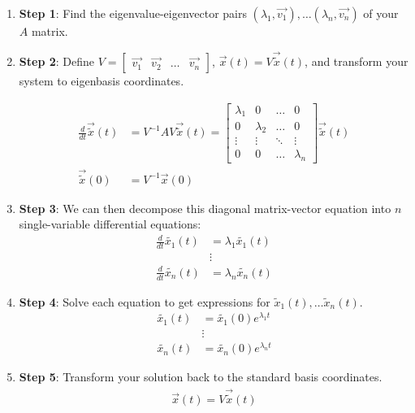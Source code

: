 \begin{enumerate}
    \item \textbf{Step 1}: Find the eigenvalue-eigenvector pairs $(\lambda_1, \vec{v_1}), \dots (\lambda_n, \vec{v_n})$ of your $A$ matrix.

    \item \textbf{Step 2}: Define $V = \begin{bmatrix}
        \vec{v_1} & \vec{v_2} & \dots & \vec{v_n}
    \end{bmatrix}$, $\vec{x}(t) = V \vec{\widetilde{x}}(t)$, and transform your system to eigenbasis coordinates.

    \begin{align*}
    \frac{d}{dt} \vec{\widetilde{x}}(t) &=  V^{-1}AV \vec{\widetilde{x}}(t) =
    \begin{bmatrix}
        \lambda_1 & 0 & \dots & 0 \\
        0 & \lambda_2 & \dots & 0 \\
        \vdots & \vdots & \ddots & \vdots \\
        0 & 0 & \dots & \lambda_n
    \end{bmatrix} \vec{\widetilde{x}}(t) \\
    \vec{\widetilde{x}}(0) &= V^{-1} \vec{x}(0)
    \end{align*}

    \item \textbf{Step 3}: We can then decompose this diagonal matrix-vector equation into $n$ single-variable differential equations:
    \begin{align*}
        \frac{d}{dt} \widetilde{x_1}(t) &= \lambda_1 \widetilde{x_1}(t) \\
        &\vdots \\
        \frac{d}{dt} \widetilde{x_n}(t) &= \lambda_n \widetilde{x_n}(t)
    \end{align*}

    \item \textbf{Step 4}: Solve each equation to get expressions for $\widetilde{x}_1(t), \ldots \widetilde{x}_n(t)$.
    \begin{align*}
        \widetilde{x_1}(t) &= \widetilde{x_1}(0) e^{\lambda_1 t} \\
        &\vdots \\
        \widetilde{x_n}(t) &= \widetilde{x_n}(0) e^{\lambda_n t} 
    \end{align*}

    \item \textbf{Step 5}: Transform your solution back to the standard basis coordinates.
    \begin{align*}
        \vec{x}(t) = V \vec{\widetilde{x}}(t)
    \end{align*}
\end{enumerate}

